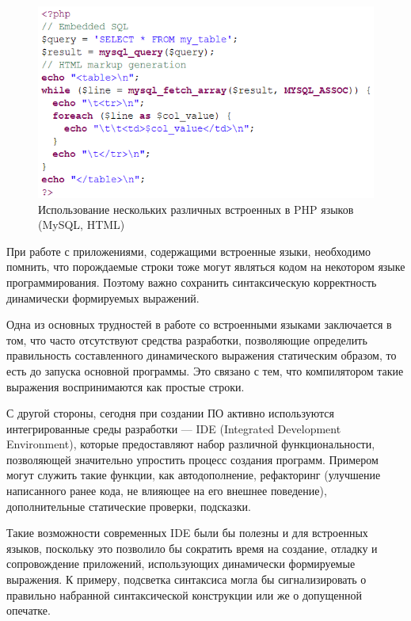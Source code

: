 \begin{figure}[h]
\centering
\includegraphics[width=\linewidth]{Ivanov/Pictures/PHP.png}
\caption{Использование нескольких различных встроенных в PHP языков (MySQL, HTML)}
\label{PHP}
\end{figure}

При работе с приложениями, содержащими встроенные языки, необходимо помнить, что порождаемые строки тоже могут являться кодом на некотором языке программирования. Поэтому важно сохранить синтаксическую корректность динамически формируемых выражений. 

Одна из основных трудностей в работе со встроенными языками заключается в том, что часто отсутствуют средства разработки, позволяющие определить правильность составленного динамического выражения статическим образом, то есть до запуска основной программы. Это связано с тем, что компилятором такие выражения воспринимаются как простые строки.

С другой стороны, сегодня при создании ПО активно используются интегрированные среды разработки --- IDE (Integrated Development Environment), которые предоставляют набор различной функциональности, позволяющей значительно упростить процесс создания программ. Примером могут служить такие функции, как автодополнение, рефакторинг (улучшение написанного ранее кода, не влияющее на его внешнее поведение), дополнительные статические проверки, подсказки. 

Такие возможности современных IDE были бы полезны и для встроенных языков, поскольку это позволило бы сократить время на создание, отладку и сопровождение приложений, использующих динамически формируемые выражения.  К примеру, подсветка синтаксиса могла бы сигнализировать о правильно набранной синтаксической конструкции или же о допущенной опечатке. 

